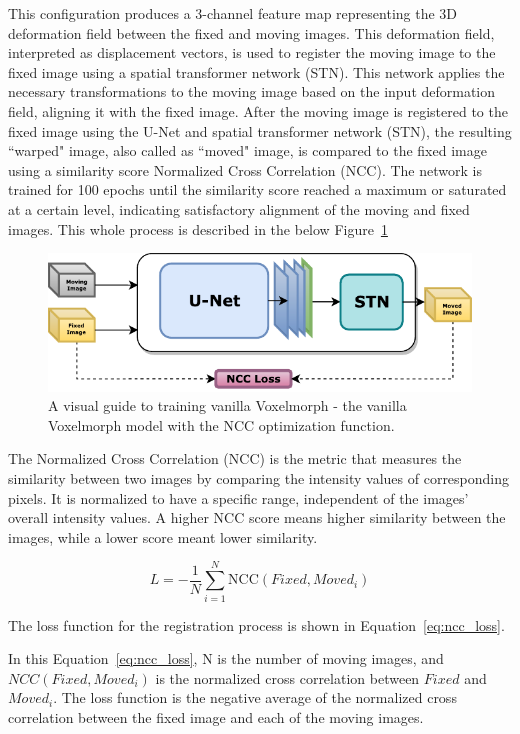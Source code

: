 \documentclass{book}
\begin{document}
	This configuration produces a 3-channel feature map representing the 3D deformation field between the fixed and moving images. This deformation field, interpreted as displacement vectors, is used to register the moving image to the fixed image using a spatial transformer network (STN). This network applies the necessary transformations to the moving image based on the input deformation field, aligning it with the fixed image. After the moving image is registered to the fixed image using the U-Net and spatial transformer network (STN), the resulting ``warped" image, also called as ``moved" image, is compared to the fixed image using a similarity score Normalized Cross Correlation (NCC). The network is trained for 100 epochs until the similarity score reached a maximum or saturated at a certain level, indicating satisfactory alignment of the moving and fixed images. This whole process is described in the below Figure~\ref{fig:block_method1}
	
	\begin{figure}[h!]
		\centering
		\includegraphics{resources/chapter4/methods/method1.pdf}
		\caption{A visual guide to training vanilla Voxelmorph - the vanilla Voxelmorph model with the NCC optimization function.}
		\label{fig:block_method1}
	\end{figure}
	
	The Normalized Cross Correlation (NCC) is the metric that measures the similarity between two images by comparing the intensity values of corresponding pixels. It is normalized to have a specific range, independent of the images' overall intensity values. A higher NCC score means higher similarity between the images, while a lower score meant lower similarity.
	
	\begin{equation}\label{eq:ncc_loss}
	L = -\frac{1}{N} \sum_{i=1}^N \text{NCC}(Fixed, Moved_i)
	\end{equation}
	
	The loss function for the registration process is shown in Equation~\ref{eq:ncc_loss}.
	
	In this Equation~\ref{eq:ncc_loss}, N is the number of moving images, and $NCC(Fixed, Moved_i)$ is the normalized cross correlation between $Fixed$ and $Moved_i$. The loss function is the negative average of the normalized cross correlation between the fixed image and each of the moving images.
	
\end{document}
